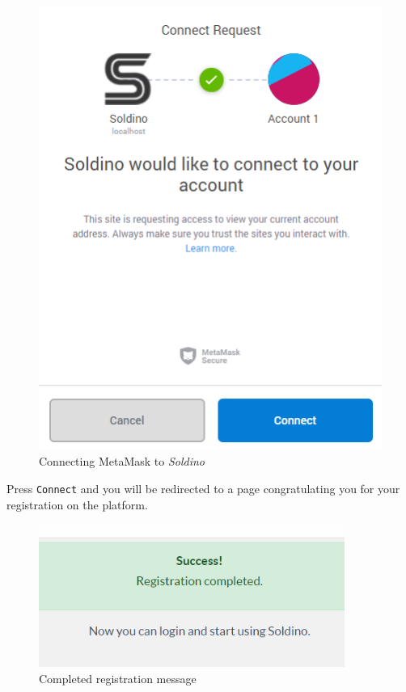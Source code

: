 	\begin{figure}[H]
		\includegraphics[width=12cm]{res/images/metamask_connect.png}
		\centering
		\caption{Connecting MetaMask to \textit{Soldino}}
	\end{figure}
	\noindent Press \texttt{Connect} and you will be redirected to a page 
	congratulating you for your registration on the platform.
	\begin{figure}[H]
		\includegraphics[width=10cm]{res/images/registration_complete.png}
		\centering
		\caption{Completed registration message}
	\end{figure}
